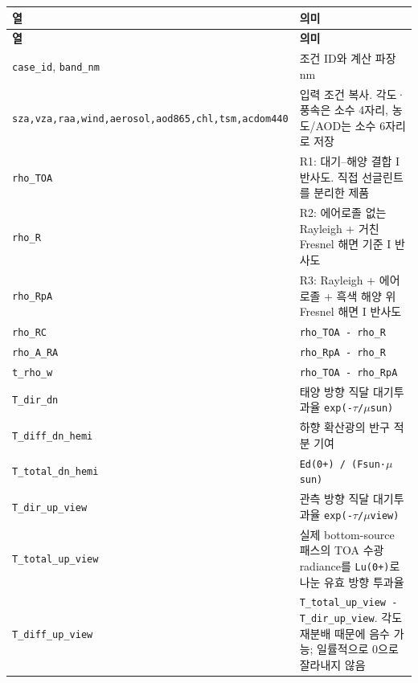 {\TableFont
\begin{longtable}{@{}>{\raggedright\arraybackslash}p{}>{\raggedright\arraybackslash}p{}@{}}
\toprule
\textbf{열} & \textbf{의미} \\
\midrule
\endfirsthead
\toprule
\textbf{열} & \textbf{의미} \\
\midrule
\endhead
\bottomrule
\endfoot
\texttt{case\_\allowbreak{}id}, \texttt{band\_\allowbreak{}nm} & 조건 ID와 계산 파장 nm \\
\texttt{sza,\allowbreak{}vza,\allowbreak{}raa,\allowbreak{}wind,\allowbreak{}aerosol,\allowbreak{}aod865,\allowbreak{}chl,\allowbreak{}tsm,\allowbreak{}acdom440} & 입력 조건 복사. 각도·풍속은 소수 4자리, 농도/AOD는 소수 6자리로 저장 \\
\texttt{rho\_\allowbreak{}TOA} & R1: 대기--해양 결합 I 반사도. 직접 선글린트를 분리한 제품 \\
\texttt{rho\_\allowbreak{}R} & R2: 에어로졸 없는 Rayleigh + 거친 Fresnel 해면 기준 I 반사도 \\
\texttt{rho\_\allowbreak{}RpA} & R3: Rayleigh + 에어로졸 + 흑색 해양 위 Fresnel 해면 I 반사도 \\
\texttt{rho\_\allowbreak{}RC} & \texttt{rho\_\allowbreak{}TOA - rho\_\allowbreak{}R} \\
\texttt{rho\_\allowbreak{}A\_\allowbreak{}RA} & \texttt{rho\_\allowbreak{}RpA - rho\_\allowbreak{}R} \\
\texttt{t\_\allowbreak{}rho\_\allowbreak{}w} & \texttt{rho\_\allowbreak{}TOA - rho\_\allowbreak{}RpA} \\
\texttt{T\_\allowbreak{}dir\_\allowbreak{}dn} & 태양 방향 직달 대기투과율 \texttt{exp(-\ensuremath{\tau}/\allowbreak{}\ensuremath{\mu}sun)} \\
\texttt{T\_\allowbreak{}diff\_\allowbreak{}dn\_\allowbreak{}hemi} & 하향 확산광의 반구 적분 기여 \\
\texttt{T\_\allowbreak{}total\_\allowbreak{}dn\_\allowbreak{}hemi} & \texttt{Ed(0+) /\allowbreak{} (Fsun·\ensuremath{\mu}sun)} \\
\texttt{T\_\allowbreak{}dir\_\allowbreak{}up\_\allowbreak{}view} & 관측 방향 직달 대기투과율 \texttt{exp(-\ensuremath{\tau}/\allowbreak{}\ensuremath{\mu}view)} \\
\texttt{T\_\allowbreak{}total\_\allowbreak{}up\_\allowbreak{}view} & 실제 bottom-source 패스의 TOA 수광 radiance를 \texttt{Lu(0+)}로 나눈 유효 방향 투과율 \\
\texttt{T\_\allowbreak{}diff\_\allowbreak{}up\_\allowbreak{}view} & \texttt{T\_\allowbreak{}total\_\allowbreak{}up\_\allowbreak{}view - T\_\allowbreak{}dir\_\allowbreak{}up\_\allowbreak{}view}. 각도 재분배 때문에 음수 가능; 일률적으로 0으로 잘라내지 않음 \\

\end{longtable}}
